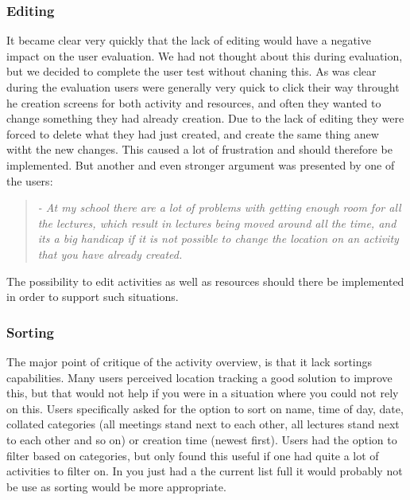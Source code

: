 \subsubsection{Editing}
It became clear very quickly that the lack of editing would have a negative impact on the user evaluation. We had not thought about this during evaluation, but we decided to complete the user test without chaning this. As was clear during the evaluation users were generally very quick to click their way throught he creation screens for both activity and resources, and often they wanted to change something they had already creation. Due to the lack of editing they were forced to delete what they had just created, and create the same thing anew witht the new changes. This caused a lot of frustration and should therefore be implemented. But another and even stronger argument was presented by one of the users:

\begin{quotation}
	\emph{
		- At my school there are a lot of problems with getting enough room for all the lectures, which result in lectures being moved around all the time, and its a big handicap if it is not possible to change the location on an activity that you have already created.
	}
\end{quotation}

The possibility to edit activities as well as resources should there be implemented in order to support such situations.

\subsubsection{Sorting}
The major point of critique of the activity overview, is that it lack sortings capabilities. Many users perceived location tracking a good solution to improve this, but that would not help if you were in a situation where you could not rely on this. Users specifically asked for the option to sort on name, time of day, date, collated categories (all meetings stand next to each other, all lectures stand next to each other and so on) or creation time (newest first). Users had the option to filter based on categories, but only found this useful if one had quite a lot of activities to filter on. In you just had a the current list full it would probably not be use as sorting would be more appropriate.